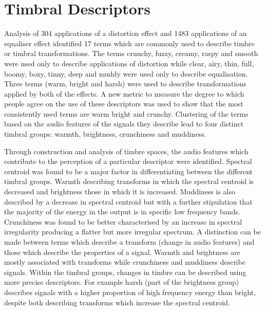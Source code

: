 \section{Timbral Descriptors}
\label{sec:Conclusion-Descriptors}
	Analysis of 304 applications of a distortion effect and 1483 applications of an equaliser effect identified 17 terms
	which are commonly used to describe timbre or timbral transformations. The terms crunchy, fuzzy, creamy, raspy and
	smooth were used only to describe applications of distortion while clear, airy, thin, full, boomy, boxy, tinny, deep
	and muddy were used only to describe equalisation. Three terms (warm, bright and harsh) were used to describe
	transformations applied by both of the effects. A new metric to measure the degree to which people agree on the use
	of these descriptors was used to show that the most consistently used terms are warm bright and crunchy. Clustering
	of the terms based on the audio features of the signals they describe lead to four distinct timbral groups:
	warmth, brightness, crunchiness and muddiness. 

	Through construction and analysis of timbre spaces, the audio features which contribute to the perception of a
	particular descriptor were identified. Spectral centroid was found to be a major factor in differentiating between
	the different timbral groups. Warmth describing transforms in which the spectral centroid is decreased and
	brightness those in which it is increased. Muddiness is also described by a decrease in spectral centroid but with a
	further stipulation that the majority of the energy in the output is in specific low frequency bands. Crunchiness
	was found to be better characterised by an increase in spectral irregularity producing a flatter but more irregular
	spectrum. A distinction can be made between terms which describe a transform (change in audio features) and those
	which describe the properties of a signal. Warmth and brightness are mostly associated with transforms while
	crunchiness and muddiness describe signals. Within the timbral groups, changes in timbre can be described using more
	precise descriptors. For example harsh (part of the brightness group) describes signals with a higher proportion of
	high frequency energy than bright, despite both describing transforms which increase the spectral centroid.

